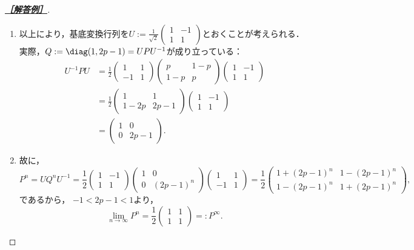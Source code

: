 \documentclass[uplatex,dvipdfmx]{jsarticle}
\begin{document}
\begin{proof}[\textbf{\underline{［解答例］}}]
\begin{enumerate}
\begin{enumerate}
\begin{enumerate}
            \end{enumerate}
            \item 以上により，基底変換行列を$U:=\frac{1}{\sqrt{2}}\begin{pmatrix}1&-1\\1&1\end{pmatrix}$とおくことが考えられる．
            実際，$Q:=\diag(1,2p-1)=UPU^{-1}$が成り立っている：
            \begin{align*}
                U^{-1}PU&=\frac{1}{2}\begin{pmatrix}1&1\\-1&1\end{pmatrix}\begin{pmatrix}p&1-p\\1-p&p\end{pmatrix}\begin{pmatrix}1&-1\\1&1\end{pmatrix}\\
                &=\frac{1}{2}\begin{pmatrix}1&1\\1-2p&2p-1\end{pmatrix}\begin{pmatrix}1&-1\\1&1\end{pmatrix}\\
                &=\begin{pmatrix}1&0\\0&2p-1\end{pmatrix}.
            \end{align*}
            \item 故に，
            \[P^n=UQ^nU^{-1}=\frac{1}{2}\begin{pmatrix}1&-1\\1&1\end{pmatrix} \begin{pmatrix}1&0\\0&(2p-1)^n\end{pmatrix}\begin{pmatrix}1&1\\-1&1\end{pmatrix}=\frac{1}{2}\begin{pmatrix}1+(2p-1)^n&1-(2p-1)^n\\1-(2p-1)^n&1+(2p-1)^n\end{pmatrix},\]
            であるから，
            $-1<2p-1<1$より，
            \[\lim_{n\to\infty}P^n=\frac{1}{2}\begin{pmatrix}1&1\\1&1\end{pmatrix}=:P^\infty.\]

\end{enumerate}
\end{enumerate}
\end{proof}
\end{document}
